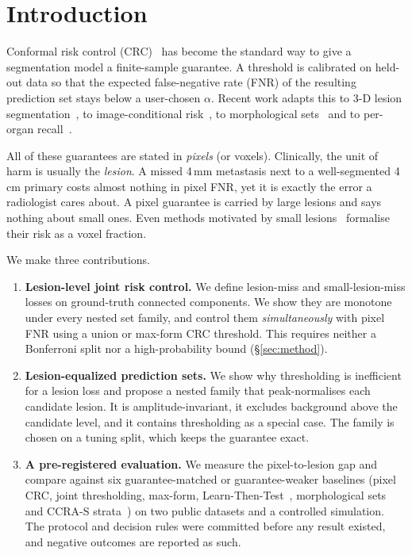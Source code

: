 \section{Introduction}

Conformal risk control (CRC)~\cite{angelopoulos2024crc} has become the standard
way to give a segmentation model a finite-sample guarantee. A threshold is
calibrated on held-out data so that the expected false-negative rate (FNR) of
the resulting prediction set stays below a user-chosen $\alpha$. Recent work
adapts this to 3-D lesion segmentation~\cite{tan2025cls}, to
image-conditional risk~\cite{luo2025ccra,recirc2026}, to morphological
sets~\cite{mossina2025morph} and to per-organ recall~\cite{perorgan2026}.

All of these guarantees are stated in \emph{pixels} (or voxels). Clinically,
the unit of harm is usually the \emph{lesion}. A missed 4\,mm metastasis next to
a well-segmented 4\,cm primary costs almost nothing in pixel FNR, yet it is
exactly the error a radiologist cares about. A pixel guarantee is carried by
large lesions and says nothing about small ones. Even methods motivated by small
lesions~\cite{tan2025cls} formalise their risk as a voxel fraction.

We make three contributions.
\begin{enumerate}
\item \textbf{Lesion-level joint risk control.} We define lesion-miss and
small-lesion-miss losses on ground-truth connected components. We show they are
monotone under every nested set family, and control them \emph{simultaneously}
with pixel FNR using a union or max-form CRC threshold. This requires neither a
Bonferroni split nor a high-probability bound (\S\ref{sec:method}).
\item \textbf{Lesion-equalized prediction sets.} We show why thresholding is
inefficient for a lesion loss and propose a nested family that peak-normalises
each candidate lesion. It is amplitude-invariant, it excludes background above
the candidate level, and it contains thresholding as a special case. The family
is chosen on a tuning split, which keeps the guarantee exact.
\item \textbf{A pre-registered evaluation.} We measure the pixel-to-lesion gap
and compare against six guarantee-matched or guarantee-weaker baselines (pixel
CRC, joint thresholding, max-form, Learn-Then-Test~\cite{angelopoulos2021ltt},
morphological sets~\cite{mossina2025morph} and CCRA-S strata~\cite{luo2025ccra})
on two public datasets and a controlled simulation. The protocol and decision
rules were committed before any result existed, and negative outcomes are
reported as such.
\end{enumerate}

